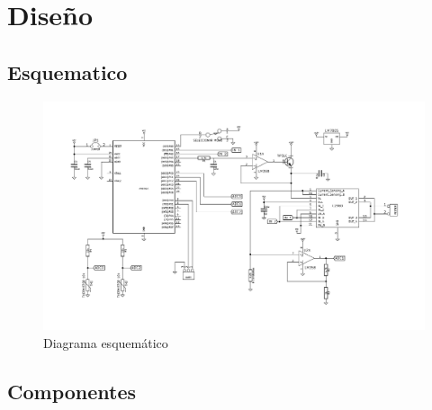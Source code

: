\documentclass[10pt,spanish,a4paper,openany,notitlepage]{article}
\begin{document}
\section{Diseño}

\subsection{Esquematico}


\begin{figure}[H] %
\begin{center}
\includegraphics[scale=0.89, angle=-90]{../circuitos/esquematico.pdf}
\caption{Diagrama esquemático}
 \label{fig:esquematico}
\end{center}
\end{figure}

\subsection{Componentes}
\end{document}

